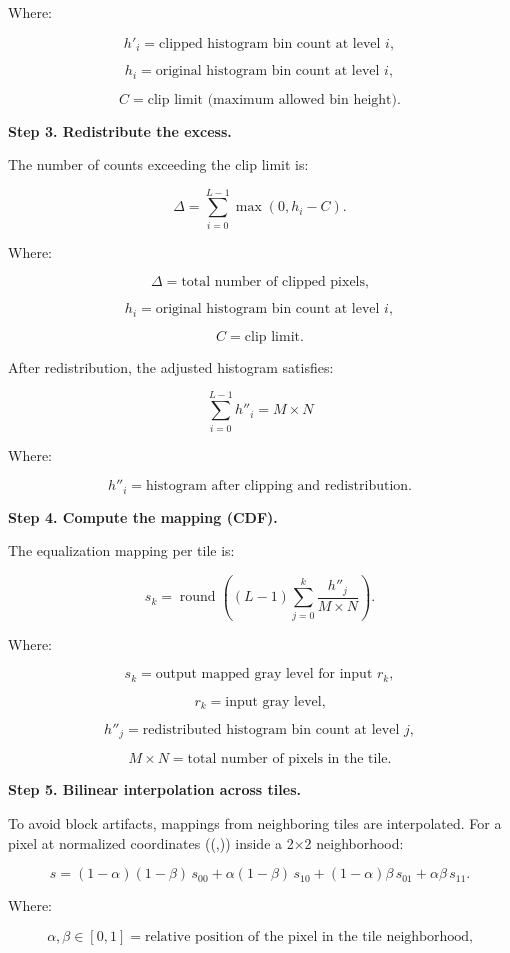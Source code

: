 \documentclass[11pt]{article}
\begin{document}
Where:

\[
h'_i = \text{clipped histogram bin count at level } i,
\]

\[
h_i = \text{original histogram bin count at level } i,
\]

\[
C = \text{clip limit (maximum allowed bin height).}
\]

\textbf{Step 3. Redistribute the excess.}

The number of counts exceeding the clip limit is:

\[
\Delta = \sum_{i=0}^{L-1} \max(0, h_i - C).
\]

Where:

\[
\Delta = \text{total number of clipped pixels,}
\]

\[
h_i = \text{original histogram bin count at level } i,
\]

\[
C = \text{clip limit.}
\]

After redistribution, the adjusted histogram satisfies:

\[
\sum_{i=0}^{L-1} h''_i = M \times N
\]

Where:

\[
h''_i = \text{histogram after clipping and redistribution.}
\]

\textbf{Step 4. Compute the mapping (CDF).}

The equalization mapping per tile is:

\[
s_k = \operatorname{round}\!\left( (L-1) \sum_{j=0}^{k} \frac{h''_j}{M \times N} \right).
\]

Where:

\[
s_k = \text{output mapped gray level for input } r_k,
\]

\[
r_k = \text{input gray level,}
\]

\[
h''_j = \text{redistributed histogram bin count at level } j,
\]

\[
M \times N = \text{total number of pixels in the tile.}
\]

\textbf{Step 5. Bilinear interpolation across tiles.}

To avoid block artifacts, mappings from neighboring tiles are
interpolated. For a pixel at normalized coordinates ((\alpha,\beta))
inside a 2×2 neighborhood:

\[
s = (1-\alpha)(1-\beta)\,s_{00} + \alpha(1-\beta)\,s_{10} + (1-\alpha)\beta\,s_{01} + \alpha\beta\,s_{11}.
\]

Where:

\[
\alpha, \beta \in [0,1] = \text{relative position of the pixel in the tile neighborhood,}
\]
\end{document}
